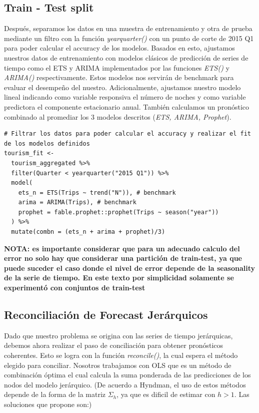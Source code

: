 \subsection{Train - Test split}
Después, separamos los datos en una muestra de entrenamiento y otra de prueba mediante un filtro con la función \textit{yearquarter()} con un punto de corte de  2015 Q1 para poder calcular el accuracy de los modelos. Basados en esto, ajustamos nuestros datos de entrenamiento con modelos clásicos de predicción de series de tiempo como el ETS y ARIMA implementados por las funciones \textit{ETS()} y \textit{ARIMA()} respectivamente. Estos modelos nos servirán de benchmark para evaluar el desempeño del nuestro. Adicionalmente, ajustamos nuestro modelo lineal indicando como variable responsiva el número de noches y como variable predictora el componente estacionario anual. También calculamos un pronóstico combinado al promediar los 3 modelos descritos (\textit{ETS, ARIMA, Prophet}).




\begin{lstlisting}
# Filtrar los datos para poder calcular el accuracy y realizar el fit de los modelos definidos
tourism_fit <- 
  tourism_aggregated %>%
  filter(Quarter < yearquarter("2015 Q1")) %>% 
  model(
    ets_n = ETS(Trips ~ trend("N")), # benchmark
    arima = ARIMA(Trips), # benchmark
    prophet = fable.prophet::prophet(Trips ~ season("year"))
  ) %>% 
  mutate(combn = (ets_n + arima + prophet)/3)
\end{lstlisting}


\textbf{NOTA: es importante considerar que para un adecuado calculo del error no solo hay que considerar una partición de train-test, ya que puede suceder el caso donde el nivel de error depende de la seasonality de la serie de tiempo. En este texto por simplicidad solamente se experimentó con conjuntos de train-test}

\newpage

\subsection{Reconciliación de Forecast Jerárquicos}

Dado que nuestro problema se origina con las series de tiempo jerárquicas, debemos ahora realizar el paso de conciliación para obtener pronósticos coherentes. Esto se logra con la función \textit{reconcile()}, la cual espera el método elegido para conciliar. Nosotros trabajamos con OLS que es un método de combinación óptima el cual calcula la suma ponderada de las predicciones de los nodos del modelo jerárquico. (De acuerdo a Hyndman, el uso de estos métodos depende de la forma de la matriz $\Sigma_h$, ya que es dificil de estimar con $h > 1$. Las soluciones que propone son:)

